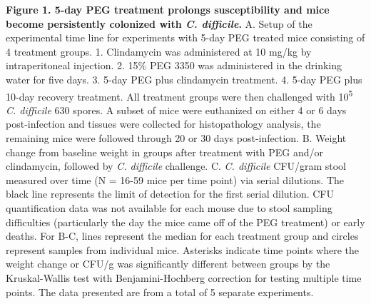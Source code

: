 \documentclass[
  11pt,
]{article}
\begin{document}
\textbf{Figure 1. 5-day PEG treatment prolongs susceptibility and mice
become persistently colonized with \emph{C. difficile}.} A. Setup of the
experimental time line for experiments with 5-day PEG treated mice
consisting of 4 treatment groups. 1. Clindamycin was administered at 10
mg/kg by intraperitoneal injection. 2. 15\% PEG 3350 was administered in
the drinking water for five days. 3. 5-day PEG plus clindamycin
treatment. 4. 5-day PEG plus 10-day recovery treatment. All treatment
groups were then challenged with 10\textsuperscript{5} \emph{C.
difficile} 630 spores. A subset of mice were euthanized on either 4 or 6
days post-infection and tissues were collected for histopathology
analysis, the remaining mice were followed through 20 or 30 days
post-infection. B. Weight change from baseline weight in groups after
treatment with PEG and/or clindamycin, followed by \emph{C. difficile}
challenge. C. \emph{C. difficile} CFU/gram stool measured over time (N =
16-59 mice per time point) via serial dilutions. The black line
represents the limit of detection for the first serial dilution. CFU
quantification data was not available for each mouse due to stool
sampling difficulties (particularly the day the mice came off of the PEG
treatment) or early deaths. For B-C, lines represent the median for each
treatment group and circles represent samples from individual mice.
Asterisks indicate time points where the weight change or CFU/g was
significantly different between groups by the Kruskal-Wallis test with
Benjamini-Hochberg correction for testing multiple time points. The data
presented are from a total of 5 separate experiments. \newpage
\end{document}
